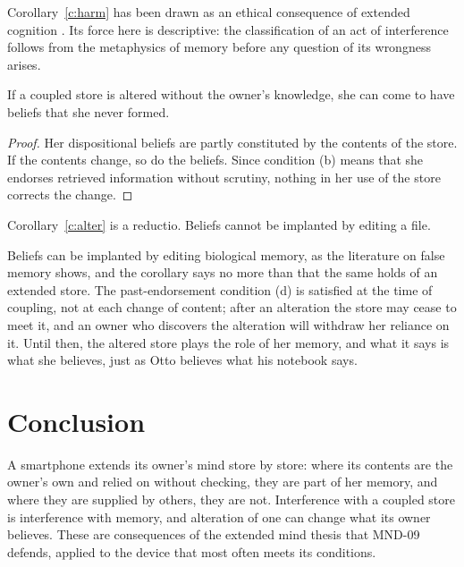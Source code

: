 \documentclass{situationist-preprint}
\begin{document}
Corollary~\ref{c:harm} has been drawn as an ethical consequence of extended cognition \citep{CarterPalermos2016}. Its force here is descriptive: the classification of an act of interference follows from the metaphysics of memory before any question of its wrongness arises.

\begin{corollary}\label{c:alter}
If a coupled store is altered without the owner's knowledge, she can come to have beliefs that she never formed.
\end{corollary}

\begin{proof}
Her dispositional beliefs are partly constituted by the contents of the store. If the contents change, so do the beliefs. Since condition (b) means that she endorses retrieved information without scrutiny, nothing in her use of the store corrects the change.
\end{proof}

\begin{objection}
Corollary~\ref{c:alter} is a reductio. Beliefs cannot be implanted by editing a file.
\end{objection}

\begin{reply}
Beliefs can be implanted by editing biological memory, as the literature on false memory shows, and the corollary says no more than that the same holds of an extended store. The past-endorsement condition (d) is satisfied at the time of coupling, not at each change of content; after an alteration the store may cease to meet it, and an owner who discovers the alteration will withdraw her reliance on it. Until then, the altered store plays the role of her memory, and what it says is what she believes, just as Otto believes what his notebook says.
\end{reply}

\section{Conclusion}

A smartphone extends its owner's mind store by store: where its contents are the owner's own and relied on without checking, they are part of her memory, and where they are supplied by others, they are not. Interference with a coupled store is interference with memory, and alteration of one can change what its owner believes. These are consequences of the extended mind thesis that MND-09 defends, applied to the device that most often meets its conditions.
\end{document}
